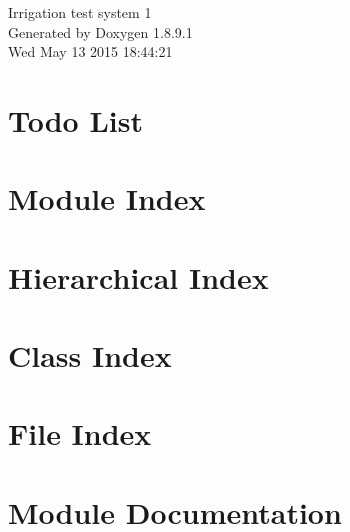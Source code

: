\documentclass[twoside]{book}
\newcommand{\+}{\discretionary{\mbox{\scriptsize$\hookleftarrow$}}{}{}}
\newcommand{\clearemptydoublepage}{%
  \newpage{\pagestyle{empty}\cleardoublepage}%
}
\begin{document}
\hypersetup{pageanchor=false,
             bookmarks=true,
             bookmarksnumbered=true,
             pdfencoding=unicode
            }
\begin{titlepage}
\vspace*{7cm}
\begin{center}%
{\Large Irrigation test system 1 }\\
\vspace*{1cm}
{\large Generated by Doxygen 1.8.9.1}\\
\vspace*{0.5cm}
{\small Wed May 13 2015 18:44:21}\\
\end{center}
\end{titlepage}
\clearemptydoublepage
\tableofcontents
\clearemptydoublepage
{}
\hypersetup{pageanchor=true}

\chapter{Todo List}
\label{todo}
\hypertarget{todo}{}

\chapter{Module Index}

\chapter{Hierarchical Index}

\chapter{Class Index}

\chapter{File Index}

\chapter{Module Documentation}






\end{document}
